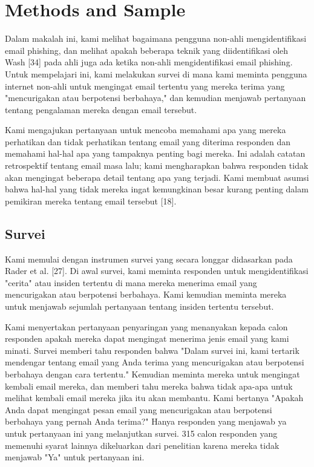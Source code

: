 \documentclass[lettersize,journal]{IEEEtran}
\begin{document}
\section{Methods and Sample}

Dalam makalah ini, kami melihat bagaimana pengguna non-ahli mengidentifikasi
email phishing, dan melihat apakah beberapa teknik yang diidentifikasi oleh
Wash [34] pada ahli juga ada ketika non-ahli mengidentifikasi email phishing.
Untuk mempelajari ini, kami melakukan survei di mana kami meminta pengguna
internet non-ahli untuk mengingat email tertentu yang mereka terima yang
"mencurigakan atau berpotensi berbahaya," dan kemudian menjawab pertanyaan
tentang pengalaman mereka dengan email tersebut.

Kami mengajukan pertanyaan untuk mencoba memahami apa yang mereka perhatikan
dan tidak perhatikan tentang email yang diterima responden dan memahami hal-hal
apa yang tampaknya penting bagi mereka. Ini adalah catatan retrospektif tentang
email masa lalu; kami mengharapkan bahwa responden tidak akan mengingat
beberapa detail tentang apa yang terjadi. Kami membuat asumsi bahwa hal-hal
yang tidak mereka ingat kemungkinan besar kurang penting dalam pemikiran mereka
tentang email tersebut [18].

\subsection{Survei}
Kami memulai dengan instrumen survei yang secara longgar didasarkan pada Rader
et al. [27]. Di awal survei, kami meminta responden untuk mengidentifikasi
"cerita" atau insiden tertentu di mana mereka menerima email yang mencurigakan
atau berpotensi berbahaya. Kami kemudian meminta mereka untuk menjawab sejumlah
pertanyaan tentang insiden tertentu tersebut.

Kami menyertakan pertanyaan penyaringan yang menanyakan kepada calon responden
apakah mereka dapat mengingat menerima jenis email yang kami minati. Survei
memberi tahu responden bahwa "Dalam survei ini, kami tertarik mendengar tentang
email yang Anda terima yang mencurigakan atau berpotensi berbahaya dengan cara
tertentu." Kemudian meminta mereka untuk mengingat kembali email mereka, dan
memberi tahu mereka bahwa tidak apa-apa untuk melihat kembali email mereka jika
itu akan membantu. Kami bertanya "Apakah Anda dapat mengingat pesan email yang
mencurigakan atau berpotensi berbahaya yang pernah Anda terima?" Hanya
responden yang menjawab ya untuk pertanyaan ini yang melanjutkan survei. 315
calon responden yang memenuhi syarat lainnya dikeluarkan dari penelitian karena
mereka tidak menjawab "Ya" untuk pertanyaan ini.
\end{document}

